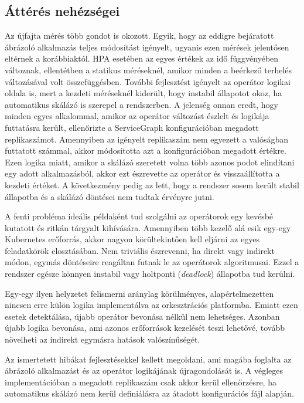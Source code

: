 \subsection{Áttérés nehézségei}
Az újfajta mérés több gondot is okozott. 
Egyik, hogy az eddigre bejáratott ábrázoló alkalmazás teljes módosítást igényelt, ugyanis ezen mérések jelentősen eltérnek a korábbiaktól.
HPA esetében az egyes értékek az idő függvényében változnak, ellentétben a statikus méréseknél, amikor minden a beérkező terhelés változásával volt összefüggésben.
További fejlesztést igényelt az operátor logikai oldala is, mert a kezdeti méréseknél kiderült, hogy instabil állapotot okoz, ha automatikus skálázó is szerepel a rendszerben. 
A jelenség onnan eredt, hogy minden egyes alkalommal, amikor az operátor változást észlelt és logikája futtatásra került, ellenőrizte a ServiceGraph konfigurációban megadott replikaszámot. 
Amennyiben az igényelt replikaszám nem egyezett a valóságban futtatott számmal, akkor módosította azt a konfigurációban megadott értékre.
Ezen logika miatt, amikor a skálázó szeretett volna több azonos podot elindítani egy adott alkalmazásból, akkor ezt észrevette az operátor és visszaállította a kezdeti értéket.
A következmény pedig az lett, hogy a rendszer sosem került stabil állapotba és a skálázó döntései nem tudtak érvényre jutni.

A fenti probléma ideális példaként tud szolgálni az operátorok egy kevésbé kutatott és ritkán tárgyalt kihívására.
Amennyiben több kezelő alá esik egy-egy Kubernetes erőforrás, akkor nagyon körültekintően kell eljárni az egyes feladatkörök elosztásában.
Nem triviális észrevenni, ha direkt vagy indirekt módon, egymás döntéseire reagáltan futnak le az operátorok algoritmusai.
Ezzel a rendszer egésze könnyen instabil vagy holtponti (\textit{deadlock}) állapotba tud kerülni.

Egy-egy ilyen helyzetet felismerni aránylag körülményes, alapértelmezetten nincsen erre külön logika implementálva az orkesztrációs platformba.
Emiatt ezen esetek detektálása, újabb operátor bevonása nélkül nem lehetséges.
Azonban újabb logika bevonása, ami azonos erőforrások kezelését teszi lehetővé, tovább növelheti az indirekt egymásra hatások valószínűségét.

Az ismertetett hibákat fejlesztésekkel kellett megoldani, ami magába foglalta az ábrázoló alkalmazást és az operátor logikájának újragondolását is.
A végleges implementációban a megadott replikaszám csak akkor kerül ellenőrzésre, ha automatikus skálázó nem kerül definiálásra az átadott konfigurációs fájl alapján.

